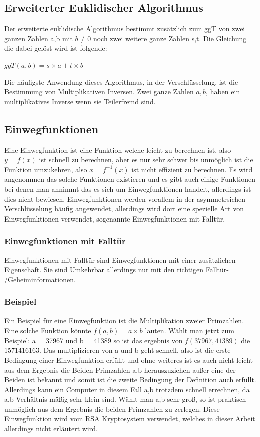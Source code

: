\documentclass[a4paper,12pt,titlepage]{article}
\begin{document}
\subsection{Erweiterter Euklidischer Algorithmus}
Der erweiterte euklidische Algorithmus bestimmt zusätzlich zum ggT von zwei ganzen Zahlen a,b mit $b \neq 0$ noch zwei weitere ganze Zahlen s,t. Die Gleichung die dabei gelöst wird ist folgende: \newline

\begin{center}
$ggT(a,b) = s \times a + t \times b$
\end{center}
Die häufigste Anwendung dieses Algorithmus, in der Verschlüsselung, ist die Bestimmung von Multiplikativen Inversen. Zwei ganze Zahlen $a, b$, haben ein multiplikatives Inverse wenn sie Teilerfremd sind.

\subsection{Einwegfunktionen}
Eine Einwegfunktion ist eine Funktion welche leicht zu berechnen ist, also $y = f(x)$ ist schnell zu  berechnen, aber es nur sehr schwer bis unmöglich ist die Funktion umzukehren, also $x = f^{-1}(x)$ ist nicht effizient zu berechnen. Es wird angenommen das solche Funktionen existieren und es gibt auch einige Funktionen bei denen man annimmt das es sich um Einwegfunktionen handelt, allerdings ist dies nicht bewiesen. Einwegfunktionen werden vorallem in der asymmetrsichen Verschlüsselung häufig angewendet, allerdings wird dort eine spezielle Art von Einwegfunktionen verwendet, sogenannte Einwegfunktionen mit Falltür.

\subsubsection{Einwegfunktionen mit Falltür} \label{oneway_trapdoor}
Einwegfunktionen mit Falltür sind Einwegfunktionen mit einer zusätzlichen Eigenschaft. Sie sind Umkehrbar allerdings nur mit den richtigen Falltür- /Geheiminformationen.

\subsubsection{Beispiel}
Ein Beispiel für eine Einwegfunktion ist die Multiplikation zweier Primzahlen.
Eine solche Funktion könnte $f(a,b) = a \times b$ lauten. \newline
Wählt man jetzt zum Beispiel: a = 37967 und b = 41389 so ist das ergebnis von $f(37967, 41389)$ die 1571416163. Das multiplizieren von a und b geht schnell, also ist die erste Bedingung einer Einwegfunktion erfüllt und ohne weiteres ist es auch nicht leicht aus dem Ergebnis die Beiden Primzahlen a,b herauszuziehen außer eine der Beiden ist bekannt und somit ist die zweite Bedingung der Definition auch erfüllt. Allerdings kann ein Computer in diesem Fall a,b trotzdem schnell errechnen, da a,b Verhältnis mäßig sehr klein sind. Wählt man a,b sehr groß, so ist praktisch unmöglich aus dem Ergebnis die beiden Primzahlen zu zerlegen. 
Diese Einwegfunktion wird vom RSA Kryptosystem verwendet, welches in dieser Arbeit allerdings nicht erläutert wird.
\end{document}
